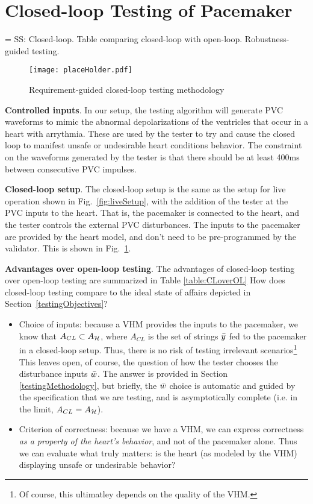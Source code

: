 \section{Closed-loop Testing of Pacemaker}
\label{closedloop}

= SS: Closed-loop.
Table comparing closed-loop with open-loop.
Robustness-guided testing.
%

\begin{figure}[!t]
	\centering
	\texttt{[image: placeHolder.pdf]}
	\caption{\small Requirement-guided closed-loop testing methodology}
	\label{fig:reqGuidedTesting}
\end{figure} 

\textbf{Controlled inputs}.
In our setup, the testing algorithm will generate PVC waveforms to mimic the abnormal depolarizations of the ventricles that occur in a heart with arrythmia. 
These are used by the tester to try and cause the closed loop to manifest unsafe or undesirable heart conditions behavior. 
The constraint on the waveforms generated by the tester is that there should be at least 400ms between consecutive PVC impulses.

\textbf{Closed-loop setup}.
The closed-loop setup is the same as the setup for live operation shown in Fig.~\ref{fig:liveSetup}, with the addition of the tester at the PVC inputs to the heart.
That is, the pacemaker is connected to the heart, and the tester controls the external PVC disturbances.
The inputs to the pacemaker are provided by the heart model, and don't need to be pre-programmed by the validator.
This is shown in Fig.~\ref{fig:reqGuidedTesting}.

\textbf{Advantages over open-loop testing}.
The advantages of closed-loop testing over open-loop testing are summarized in Table \ref{table:CLoverOL}
How does closed-loop testing compare to the ideal state of affairs depicted in Section~\ref{testingObjectives}?
\begin{itemize}
	\item Choice of inputs: because a VHM provides the inputs to the pacemaker, we know that $A_{CL} \subset A_{\mathcal{H}}$, where $A_{CL}$ is the set of strings $\bar{y}$ fed to the pacemaker in a closed-loop setup. 
	Thus, there is no risk of testing irrelevant scenarios\footnote{Of course, this ultimatley depends on the quality of the VHM.}
	This leaves open, of course, the question of how the tester chooses the disturbance inputs $\bar{w}$. The answer is provided in Section \ref{testingMethodology}, but briefly, the $\bar{w}$ choice is automatic and guided by the specification that we are testing, and is asymptotically complete (i.e. in the limit, $A_{CL} = A_{\mathcal{H}}$).
	\item Criterion of correctness: because we have a VHM, we can express correctness \emph{as a property of the heart's behavior}, and not of the pacemaker alone. 
	Thus we can evaluate what truly matters: is the heart (as modeled by the VHM) displaying unsafe or undesirable behavior?
\end{itemize}

